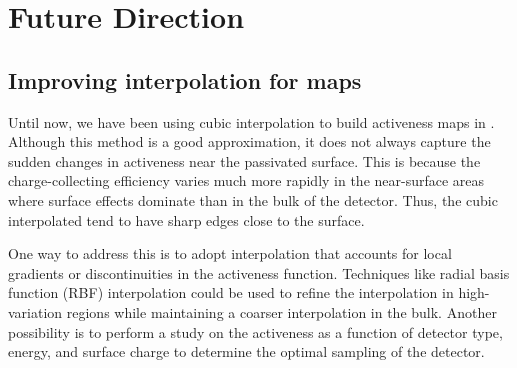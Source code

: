 \section{Future Direction}


\subsection{Improving interpolation for {\ehd} maps}
Until now, we have been using cubic interpolation to build activeness maps in {\ehd}. Although this method is a good approximation, it does not always capture the sudden changes in activeness near the passivated surface. This is because the charge-collecting efficiency varies much more rapidly in the near-surface areas where surface effects dominate than in the bulk of the detector. Thus, the cubic interpolated tend to have sharp edges close to the surface.

One way to address this is to adopt interpolation that accounts for local gradients or discontinuities in the activeness function. Techniques like radial basis function (RBF) interpolation could be used to refine the interpolation in high-variation regions while maintaining a coarser interpolation in the bulk. Another possibility is to perform a study on the activeness as a function of detector type, energy, and surface charge to determine the optimal sampling of the detector.

